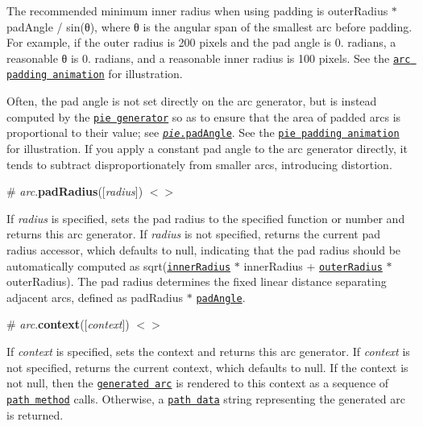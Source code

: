 The recommended minimum inner radius when using padding is outer\+Radius $\ast$ pad\+Angle / sin(θ), where θ is the angular span of the smallest arc before padding. For example, if the outer radius is 200 pixels and the pad angle is 0. radians, a reasonable θ is 0. radians, and a reasonable inner radius is 100 pixels. See the \href{http://bl.ocks.org/mbostock/053fcc2295a445afab07}{\tt arc padding animation} for illustration.

Often, the pad angle is not set directly on the arc generator, but is instead computed by the \href{#pies}{\tt pie generator} so as to ensure that the area of padded arcs is proportional to their value; see \href{#pie_padAngle}{\tt {\itshape pie}.pad\+Angle}. See the \href{http://bl.ocks.org/mbostock/3e961b4c97a1b543fff2}{\tt pie padding animation} for illustration. If you apply a constant pad angle to the arc generator directly, it tends to subtract disproportionately from smaller arcs, introducing distortion.

\label{_arc_padRadius}%
\# {\itshape arc}.{\bfseries pad\+Radius}(\mbox{[}{\itshape radius}\mbox{]}) \href{https://github.com/d3/d3-shape/blob/master/src/arc.js#L242}{\tt $<$$>$}

If {\itshape radius} is specified, sets the pad radius to the specified function or number and returns this arc generator. If {\itshape radius} is not specified, returns the current pad radius accessor, which defaults to null, indicating that the pad radius should be automatically computed as sqrt(\href{#arc_innerRadius}{\tt inner\+Radius} $\ast$ inner\+Radius + \href{#arc_outerRadius}{\tt outer\+Radius} $\ast$ outer\+Radius). The pad radius determines the fixed linear distance separating adjacent arcs, defined as pad\+Radius $\ast$ \href{#arc_padAngle}{\tt pad\+Angle}.

\label{_arc_context}%
\# {\itshape arc}.{\bfseries context}(\mbox{[}{\itshape context}\mbox{]}) \href{https://github.com/d3/d3-shape/blob/master/src/arc.js#L258}{\tt $<$$>$}

If {\itshape context} is specified, sets the context and returns this arc generator. If {\itshape context} is not specified, returns the current context, which defaults to null. If the context is not null, then the \href{#_arc}{\tt generated arc} is rendered to this context as a sequence of \href{http://www.w3.org/TR/2dcontext/#canvaspathmethods}{\tt path method} calls. Otherwise, a \href{http://www.w3.org/TR/SVG/paths.html#PathData}{\tt path data} string representing the generated arc is returned.

